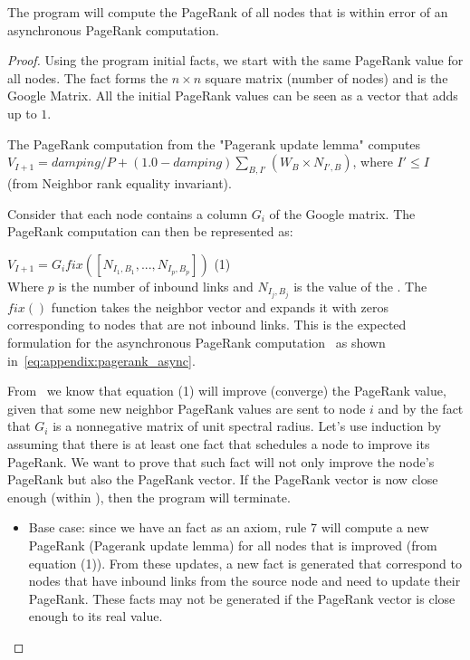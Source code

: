 \begin{theorem}
The program will compute the PageRank of all nodes that is within  error
of an asynchronous PageRank computation.
\end{theorem}
\begin{proof}

Using the program initial facts, we start with the same PageRank value for all
nodes.  The  fact forms the $n \times n$ square
matrix (number of nodes) and is the Google Matrix.  All the initial PageRank
values can be seen as a vector that adds up to $1$.

The PageRank computation from the "Pagerank update lemma" computes $V_{I + 1} =
damping / P + (1.0 - damping)\sum_{B, I'} (W_{B} \times N_{I',B})$, where $I'
\leq I$ (from Neighbor rank equality invariant).

Consider that each node contains a column $G_i$ of the Google matrix. The
PageRank computation can then be represented as: \newline


$V_{I + 1} = G_i fix([N_{I_1, B_1}, ..., N_{I_p, B_p}])$ \hfill (1) \\


Where $p$ is the number of inbound links and $N_{I_j, B_j}$ is the value of the
. The $fix()$ function
takes the neighbor vector and expands it with zeros corresponding to nodes that
are not inbound links. This is the expected formulation for the asynchronous
PageRank computation~\cite{DBLP:journals/corr/abs-cs-0606047} as shown
in~\ref{eq:appendix:pagerank_async}.

From~\cite{DBLP:journals/corr/abs-cs-0606047, Lubachevsky:1986:CAA:4904.4801} we
know that equation (1) will improve (converge) the PageRank value, given that
some new neighbor PageRank values are sent to node $i$ and by the fact that
$G_i$ is a nonnegative matrix of unit spectral radius. Let's use induction by
assuming that there is at least one  fact that schedules a node to
improve its PageRank. We want to prove that such fact will not only improve the
node's PageRank but also the PageRank vector.  If the PageRank vector is now
close enough (within ), then the program will terminate.

\begin{itemize}

   \item Base case: since we have an  fact as an axiom, rule 7 will
      compute a new PageRank (Pagerank update lemma) for all nodes that is
      improved (from equation (1)). From these updates, a new  fact
      is generated that correspond to nodes that have inbound links from the
      source node and need to update their PageRank. These  facts
      may not be generated if the PageRank vector is close enough to its real
      value.


\end{itemize}
\end{proof}
